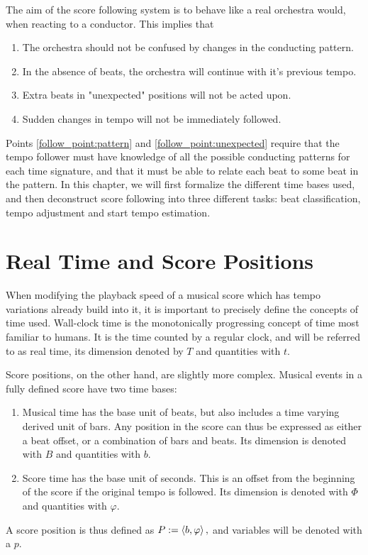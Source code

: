 The aim of the score following system
is to behave like a real orchestra would,
when reacting to a conductor.
This implies that
\begin{enumerate}
\item The orchestra should not be confused by changes in the conducting pattern. \label{follow_point:pattern}
\item In the absence of beats, the orchestra will continue with it's previous tempo.
\item Extra beats in "unexpected" positions will not be acted upon. \label{follow_point:unexpected}
\item Sudden changes in tempo will not be immediately followed.
\end{enumerate}
Points \ref{follow_point:pattern} and \ref{follow_point:unexpected} require
that the tempo follower must have knowledge of all the possible
conducting patterns for each time signature,
and that it must be able to relate each beat to some beat in the pattern.
In this chapter,
we will first formalize the different time bases used,
and then deconstruct score following into
three different tasks:
beat classification, tempo adjustment and start tempo estimation.

\section{Real Time and Score Positions}
\label{sec:meth:read_and_score_time}

When modifying the playback speed of a musical score
which has tempo variations already build into it,
it is important to precisely define the concepts of time used.
Wall-clock time is the monotonically progressing concept of time
most familiar to humans.
It is the time counted by a regular clock,
and will be referred to as real time,
its dimension denoted by $T$ and quantities with $t$.

Score positions, on the other hand,
are slightly more complex.
Musical events in a fully defined score have two time bases:
\begin{enumerate}
\item Musical time has the base unit of beats, but also includes a time varying derived unit of bars. Any position in the score can thus be expressed as either a beat offset, or a combination of bars and beats. Its dimension is denoted with $B$ and quantities with $b$.
\item Score time has the base unit of seconds. This is an offset from the beginning of the score if the original tempo is followed. Its dimension is denoted with $\Phi$ and quantities with $\varphi$.
\end{enumerate}
A score position is thus defined as
$ P := \left \langle b, \varphi \right \rangle , $
and variables will be denoted with a $p$.

